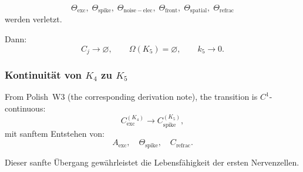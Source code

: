 \[
  \Theta_{\mathrm{exc}},\;
  \Theta_{\mathrm{spike}},\;
  \Theta_{\mathrm{noise-elec}},\;
  \Theta_{\mathrm{front}},\;
  \Theta_{\mathrm{spatial}},\;
  \Theta_{\mathrm{refrac}}
\]
werden verletzt.

Dann:
\[
  C_j \to \varnothing,
\qquad
  \Omega(K_5)=\varnothing,
\qquad
  k_5\to 0.
\]

\subsubsection{Kontinuität von \texorpdfstring{$K_4$}{K_4} zu \texorpdfstring{$K_5$}{K_5}}

From Polish~W3 (the corresponding derivation note), the transition is $C^1$-continuous:
\[
  C_{\mathrm{exc}}^{(K_4)}
   \longrightarrow
  C_{\mathrm{spike}}^{(K_5)},
\]
mit sanftem Entstehen von:
\[
  A_{\mathrm{exc}},\quad
  \Theta_{\mathrm{spike}},\quad
  C_{\mathrm{refrac}}.
\]

Dieser sanfte Übergang gewährleistet die Lebensfähigkeit der ersten Nervenzellen.
